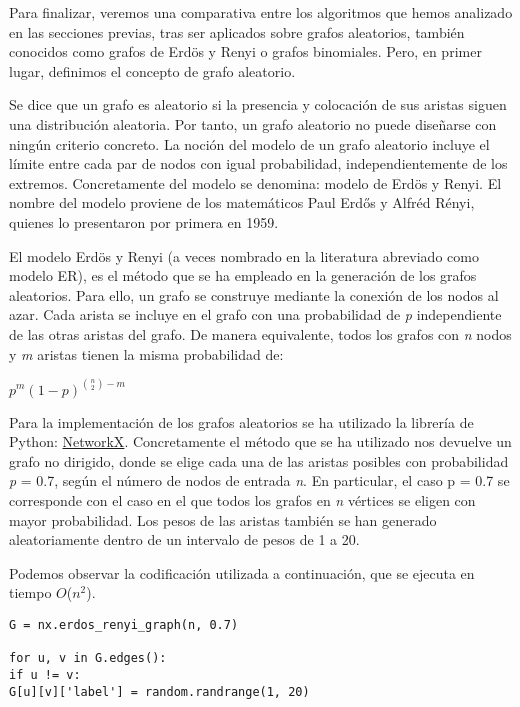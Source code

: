 Para finalizar, veremos una comparativa entre los algoritmos que hemos analizado en las secciones previas, tras ser aplicados sobre grafos aleatorios, también conocidos como grafos de Erdös y Renyi o grafos binomiales. Pero, en primer lugar, definimos el concepto de grafo aleatorio.

Se dice que un grafo es aleatorio si la presencia y colocación de sus aristas siguen una distribución aleatoria. Por tanto, un grafo aleatorio no puede diseñarse con ningún criterio concreto. La noción del modelo de un grafo aleatorio incluye el límite entre cada par de nodos con igual probabilidad, independientemente de los extremos. Concretamente del modelo se denomina: modelo de Erdös y Renyi. El nombre del modelo proviene de los matemáticos Paul Erdős y Alfréd Rényi\cite{ErdosRenyi}, quienes lo presentaron por primera en 1959.

El modelo Erdös y Renyi (a veces nombrado en la literatura abreviado como modelo ER), es el método que se ha empleado en la generación de los grafos aleatorios. Para ello, un grafo se construye mediante la conexión de los nodos al azar. Cada arista se incluye en el grafo con una probabilidad de \textit{p} independiente de las otras aristas del grafo. De manera equivalente, todos los grafos con \textit{n} nodos y \textit{m} aristas tienen la misma probabilidad de:

\begin{center}
	$p^m(1 - p)^{{n \choose 2} - m}$
\end{center}

Para la implementación de los grafos aleatorios se ha utilizado la librería de Python:  \href{https://networkx.github.io/documentation/latest/reference/generated/networkx.generators.random\_graphs.erdos\_renyi\_graph.html?highlight=erdos\%20renyi#networkx.generators.random\_graphs.erdos\_renyi\_graph}{NetworkX}. Concretamente el método que se ha utilizado nos devuelve un grafo no dirigido, donde se elige cada una de las aristas posibles con probabilidad \textit{p} = 0.7, según el número de nodos de entrada \textit{n}. En particular, el caso p = 0.7 se corresponde con el caso en el que todos los grafos en \textit{n} vértices se eligen con mayor probabilidad. Los pesos de las aristas también se han generado aleatoriamente dentro de un intervalo de pesos de 1 a 20.

Podemos observar la codificación utilizada a continuación, que se ejecuta en tiempo $O$($n^2$).

\lstset{language=Python}    
\begin{lstlisting}[frame=single]  
G = nx.erdos_renyi_graph(n, 0.7)

for u, v in G.edges():
if u != v:
G[u][v]['label'] = random.randrange(1, 20)
\end{lstlisting}

